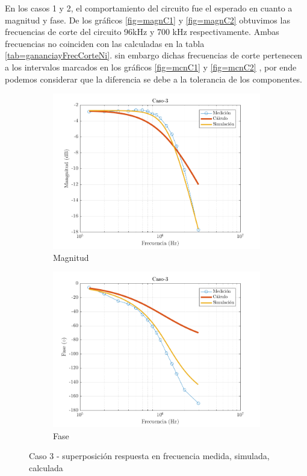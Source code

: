 \documentclass[../../main.tex]{subfiles}
\begin{document}
En los casos 1 y 2, el comportamiento del circuito fue el esperado en cuanto a magnitud y fase. De los gráficos \ref{fig=magnC1} y \ref{fig=magnC2} obtuvimos las frecuencias de corte del circuito 96kHz y 700 kHz respectivamente. Ambas frecuencias no coinciden con las calculadas en la tabla \ref{tab=gananciayFrecCorteNi}. sin embargo dichas frecuencias de corte pertenecen a los intervalos marcados en los gráficos \ref{fig=mcnC1} y \ref{fig=mcnC2} , por ende podemos considerar que la diferencia se debe a la tolerancia de los componentes.

\begin{figure}[H]
\centering
\begin{subfigure}[http]{0.49\textwidth}
\includegraphics[width=\textwidth]{imagenes/Caso-3_mag_n.png}
\caption{Magnitud}\label{fig=magnC3}
\end{subfigure}
\begin{subfigure}[http]{0.49\textwidth}
\includegraphics[width=\textwidth]{imagenes/Caso-3_fase_n.png}
\caption{Fase}
\end{subfigure}
\caption{Caso 3 - superposición respuesta en  frecuencia medida, simulada, calculada}\label{fig=bodeC3}
\end{figure}
\end{document}
